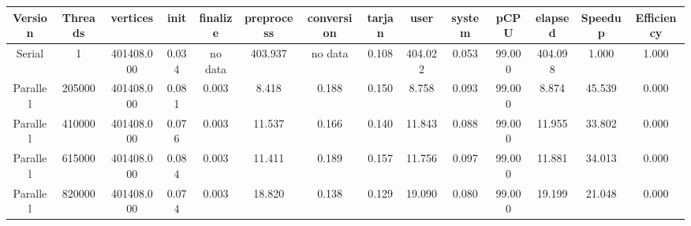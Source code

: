 \begin{tabular}{|c|c|c|c|c|c|c|c|c|c|c|c|c|c|}
\toprule
 Version &  Threads &   vertices &  init & finalize &  preprocess & conversion &  tarjan &    user &  system &   pCPU &  elapsed &  Speedup &  Efficiency \\
\midrule
  Serial &        1 & 401408.000 & 0.034 &  no data &     403.937 &    no data &   0.108 & 404.022 &   0.053 & 99.000 &  404.098 &    1.000 &       1.000 \\
Parallel &   205000 & 401408.000 & 0.081 &    0.003 &       8.418 &      0.188 &   0.150 &   8.758 &   0.093 & 99.000 &    8.874 &   45.539 &       0.000 \\
Parallel &   410000 & 401408.000 & 0.076 &    0.003 &      11.537 &      0.166 &   0.140 &  11.843 &   0.088 & 99.000 &   11.955 &   33.802 &       0.000 \\
Parallel &   615000 & 401408.000 & 0.084 &    0.003 &      11.411 &      0.189 &   0.157 &  11.756 &   0.097 & 99.000 &   11.881 &   34.013 &       0.000 \\
Parallel &   820000 & 401408.000 & 0.074 &    0.003 &      18.820 &      0.138 &   0.129 &  19.090 &   0.080 & 99.000 &   19.199 &   21.048 &       0.000 \\
\bottomrule
\end{tabular}
